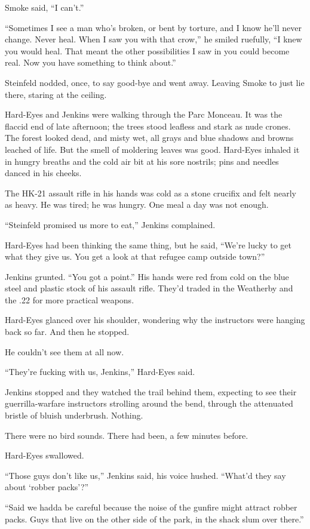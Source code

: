 Smoke said, “I can’t.”

“Sometimes I see a man who’s broken, or bent by torture, and I know he’ll never change. Never heal. When I saw you with that crow,” he smiled ruefully, “I knew you would heal. That meant the other possibilities I saw in you could become real. Now you have something to think about.”

Steinfeld nodded, once, to say good-bye and went away. Leaving Smoke to just lie there, staring at the ceiling.

Hard-Eyes and Jenkins were walking through the Parc Monceau. It was the flaccid end of late afternoon; the trees stood leafless and stark as nude crones. The forest looked dead, and misty wet, all grays and blue shadows and browns leached of life. But the smell of moldering leaves was good. Hard-Eyes inhaled it in hungry breaths and the cold air bit at his sore nostrils; pins and needles danced in his cheeks.

The HK-21 assault rifle in his hands was cold as a stone crucifix and felt nearly as heavy. He was tired; he was hungry. One meal a day was not enough.

“Steinfeld promised us more to eat,” Jenkins complained.

Hard-Eyes had been thinking the same thing, but he said, “We’re lucky to get what they give us. You get a look at that refugee camp outside town?”

Jenkins grunted. “You got a point.” His hands were red from cold on the blue steel and plastic stock of his assault rifle. They’d traded in the Weatherby and the .22 for more practical weapons.

Hard-Eyes glanced over his shoulder, wondering why the instructors were hanging back so far. And then he stopped.

He couldn’t see them at all now.

“They’re fucking with us, Jenkins,” Hard-Eyes said.

Jenkins stopped and they watched the trail behind them, expecting to see their guerrilla-warfare instructors strolling around the bend, through the attenuated bristle of bluish underbrush. Nothing.

There were no bird sounds. There had been, a few minutes before.

Hard-Eyes swallowed.

“Those guys don’t like us,” Jenkins said, his voice hushed. “What’d they say about ‘robber packs’?”

“Said we hadda be careful because the noise of the gunfire might attract robber packs. Guys that live on the other side of the park, in the shack slum over there.”

